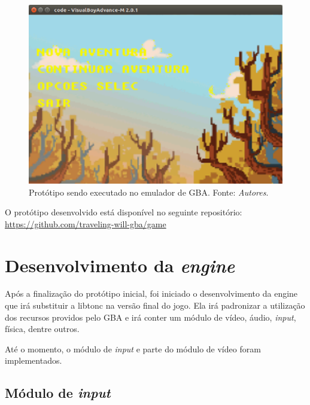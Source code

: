 \begin{figure}[H]
 \centering \includegraphics[keepaspectratio=true,scale=0.6]{figuras/tw-gba-1.eps}
   \caption[Protótipo sendo executado no emulador de GBA]
    {Protótipo sendo executado no emulador de GBA. Fonte: \textit{Autores}.}
   \label{tw-gba-1}
\end{figure}

O protótipo desenvolvido está disponível no seguinte repositório: \url{https://github.com/traveling-will-gba/game}

\section{Desenvolvimento da \textit{engine}}

Após a finalização do protótipo inicial, foi iniciado o desenvolvimento da engine que irá substituir a libtonc na versão final do jogo. Ela irá padronizar a utilização dos recursos providos pelo GBA e irá conter um módulo de vídeo, áudio, \textit{input}, física, dentre outros.

Até o momento, o módulo de \textit{input} e parte do módulo de vídeo foram implementados.

\subsection{Módulo de \textit{input}}

